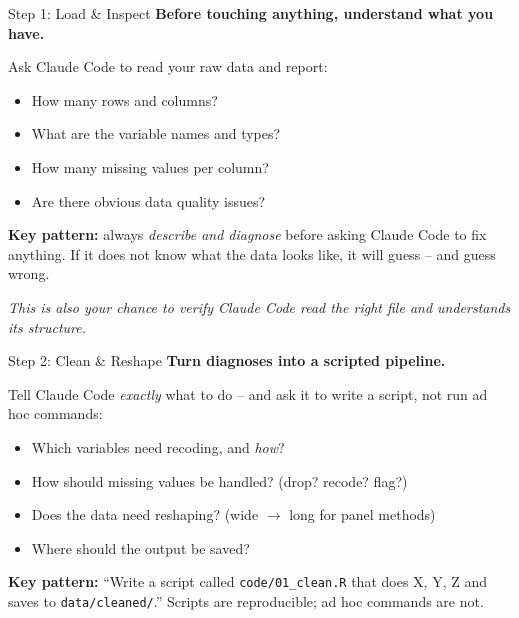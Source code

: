 \begin{frame}{Step 1: Load \& Inspect}
  \textbf{Before touching anything, understand what you have.}

  \vspace{8pt}

  Ask Claude Code to read your raw data and report:
  \begin{itemize}
    \item How many rows and columns?
    \item What are the variable names and types?
    \item How many missing values per column?
    \item Are there obvious data quality issues?
  \end{itemize}

  \vspace{8pt}

  \textbf{\textcolor{usfgreen}{Key pattern:}} always \textit{describe and diagnose} before asking Claude Code to fix anything. If it does not know what the data looks like, it will guess -- and guess wrong.

  \vspace{8pt}

  \textit{This is also your chance to verify Claude Code read the right file and understands its structure.}
\end{frame}

\begin{frame}{Step 2: Clean \& Reshape}
  \textbf{Turn diagnoses into a scripted pipeline.}

  \vspace{8pt}

  Tell Claude Code \textit{exactly} what to do -- and ask it to write a script, not run ad hoc commands:
  \begin{itemize}
    \item Which variables need recoding, and \textit{how}?
    \item How should missing values be handled? (drop? recode? flag?)
    \item Does the data need reshaping? (wide $\to$ long for panel methods)
    \item Where should the output be saved?
  \end{itemize}

  \vspace{8pt}

  \textbf{\textcolor{usfgreen}{Key pattern:}} ``Write a script called \texttt{code/01\_clean.R} that does X, Y, Z and saves to \texttt{data/cleaned/}.'' Scripts are reproducible; ad hoc commands are not.
\end{frame}

